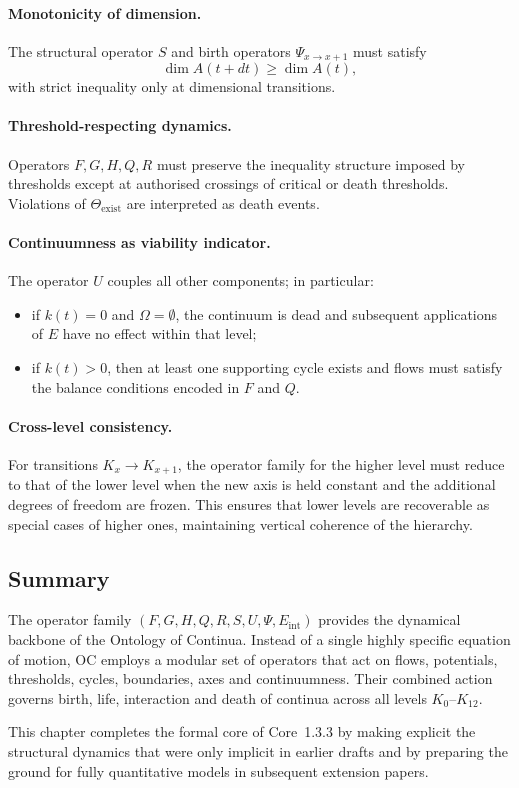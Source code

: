 \paragraph{Monotonicity of dimension.}
The structural operator \(S\) and birth operators \(\Psi_{x\to x+1}\) must
satisfy
\[
  \dim A(t+dt) \ge \dim A(t),
\]
with strict inequality only at dimensional transitions.

\paragraph{Threshold-respecting dynamics.}
Operators \(F, G, H, Q, R\) must preserve the inequality structure imposed by
thresholds except at authorised crossings of critical or death thresholds.
Violations of \(\Theta_{\mathrm{exist}}\) are interpreted as death events.

\paragraph{Continuumness as viability indicator.}
The operator \(U\) couples all other components; in particular:
\begin{itemize}
  \item if \(k(t) = 0\) and \(\Omega = \emptyset\), the continuum is dead and
        subsequent applications of \(E\) have no effect within that level;
  \item if \(k(t) > 0\), then at least one supporting cycle exists and flows
        must satisfy the balance conditions encoded in \(F\) and \(Q\).
\end{itemize}

\paragraph{Cross-level consistency.}
For transitions \(K_x \to K_{x+1}\), the operator family for the higher level
must reduce to that of the lower level when the new axis is held constant and
the additional degrees of freedom are frozen. This ensures that lower levels
are recoverable as special cases of higher ones, maintaining vertical
coherence of the hierarchy.

\subsection{Summary}

The operator family \((F, G, H, Q, R, S, U, \Psi, E_{\mathrm{int}})\) provides
the dynamical backbone of the Ontology of Continua. Instead of a single
highly specific equation of motion, OC employs a modular set of operators that
act on flows, potentials, thresholds, cycles, boundaries, axes and
continuumness. Their combined action governs birth, life, interaction and
death of continua across all levels \(K_0\)–\(K_{12}\).

This chapter completes the formal core of Core~1.3.3 by making explicit the
structural dynamics that were only implicit in earlier drafts and by preparing
the ground for fully quantitative models in subsequent extension papers.
